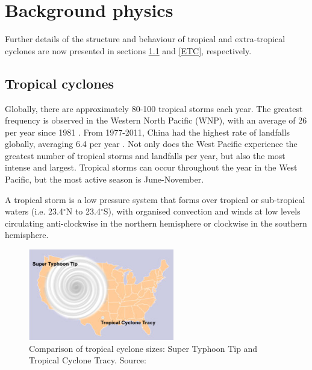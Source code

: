 
\graphicspath{{Chapter1_Back_phys/Figs/}}

\chapter{Background physics}  %

Further details of the structure and behaviour of tropical and extra-tropical cyclones are now presented in sections \ref{TC} and \ref{ETC}, respectively.


\section{Tropical cyclones} \label{TC}


Globally, there are approximately 80-100 tropical storms each year. The greatest frequency is observed in the Western North Pacific (WNP), with an average of 26 per year since 1981 \citep{zhan2012seasonal}. From 1977-2011, China had the highest rate of landfalls globally, averaging 6.4 per year \citep{HironoriFudeyasu:178}. Not only does the West Pacific experience the greatest number of tropical storms and landfalls per year, but also the most intense and largest. Tropical storms can occur throughout the year in the West Pacific, but the most active season is June-November.

A tropical storm is a low pressure system that forms over tropical or sub-tropical waters (i.e. 23.4$^{\circ}$N to  23.4$^{\circ}$S), with organised convection and winds at low levels circulating anti-clockwise in the northern hemisphere or clockwise in the southern hemisphere. 

\begin{figure}[h]
	\centering
	\noindent\includegraphics[width=15pc,angle=0]{typhoonsizes.jpg}
	\caption{Comparison of tropical cyclone sizes: Super Typhoon Tip and Tropical Cyclone Tracy. Source: \cite{noaa_structure}}\label{fig:cyclone_size}
\end{figure}

